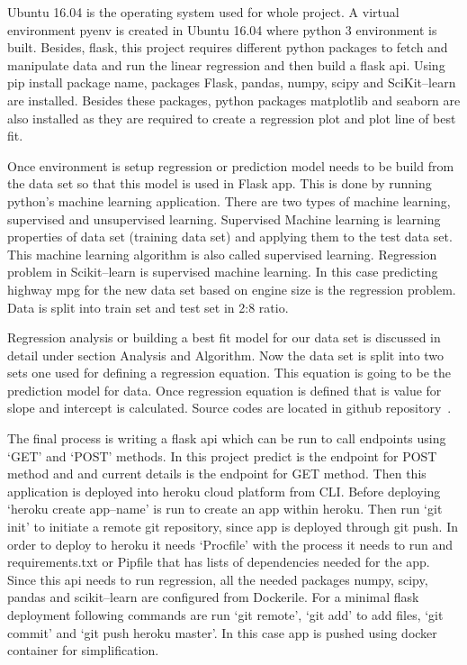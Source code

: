  Ubuntu 16.04 is the operating system used for whole project.
 A virtual environment pyenv is created in Ubuntu 16.04 where python 3
 environment is built. Besides, flask, this project requires different python
 packages to fetch and manipulate data and run the linear regression and
 then build a flask api. Using pip install package name, packages Flask,
 pandas, numpy, scipy and SciKit--learn are installed. Besides these
 packages, python packages matplotlib and seaborn are also installed as they
 are required to create a regression plot and plot line of best fit. 
 
 Once environment is setup regression or prediction model needs to be build
 from the data set so that this model is used in Flask app. This is done by
 running python's machine learning application. There are two types of
 machine learning, supervised and unsupervised learning. Supervised
 Machine learning is learning properties of data set (training data set)
 and applying them to the test data set. This machine learning algorithm
 is also called supervised learning. Regression problem in Scikit--learn
 is supervised machine learning. In this case predicting highway mpg for
 the new data set based on engine size is the regression problem. Data
 is split into train set and test set in 2:8 ratio.
    
 Regression analysis or building a best fit model for our data set is
 discussed in detail under section Analysis and Algorithm. Now the data
 set is split into two sets one used for defining a regression 
 equation. This equation is going to be the prediction model for data.
 Once regression equation is defined
 that is value for slope and intercept is calculated.   
 Source codes are located in github repository~\cite{hid-sp18-415-regression}.
   
The final process is writing a flask api which can be run to call 
endpoints using `GET' and `POST' methods. In this project predict is the
endpoint for POST method and and current details is the endpoint for GET
method. Then this application is deployed into heroku cloud platform from
CLI. Before deploying `heroku create app--name' is run to create an app within
heroku. Then run `git init' to initiate a remote git repository, since app is 
deployed through git push. In order to deploy to heroku it needs `Procfile'
with the process it needs to run and requirements.txt or Pipfile that has lists 
of dependencies needed for the app. Since this api needs to run regression, all
the needed packages numpy, scipy, pandas and scikit--learn are configured from 
Dockerile. For a minimal flask deployment following commands are run 
`git remote', `git add' to add files, `git commit' and `git push heroku master'.
In this case app is pushed using docker container for simplification.    

